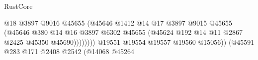 \begin{lexlean}{RustCore}
\begin{coremodule}
                                                                @18
                                                                @3897
                                                                @9016
                                                                @45655
                                                                (@45646
                                                                  @1412
                                                                  @14
                                                                  @17
                                                                  @3897
                                                                  @9015
                                                                  @45655
                                                                  (@45646
                                                                    @380
                                                                    @14
                                                                    @16
                                                                    @3897
                                                                    @6302
                                                                    @45655
                                                                    (@45624
                                                                      @192
                                                                      @14
                                                                      @11
                                                                      @2867
                                                                      @2425
                                                                      @45350
                                                                      @45690))))))))
                                                      @19551
                                                      @19554
                                                      @19557
                                                      @19560
                                                      @15056))
                                                  (@45591
                                                    @283
                                                    @171
                                                    @2408
                                                    @2542
                                                    (@14068
                                                      @45264

\end{coremodule}
\end{lexlean}
